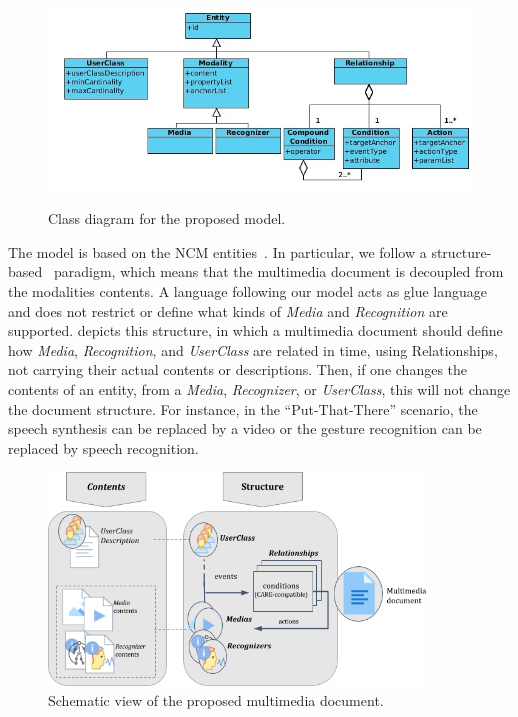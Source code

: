 \begin{figure}[!ht]
\begin{center}
	\includegraphics[width=12cm, keepaspectratio]{img/img9.png}
	\caption{Class diagram for the proposed model.}
	\captionvspace
	\label{fig:model}
\end{center}
\end{figure}

The model is based on the NCM entities~\cite{soares_nested_2009}. In particular,
we follow a structure-based~\cite{bolt_put-that-there:_1980} paradigm, which
means that the multimedia document is decoupled from the modalities contents. A
language following our model acts as glue language and does not restrict or
define what kinds of \textit{Media} and
\textit{Recognition} are supported.  depicts this structure,
in which a
multimedia document should define how \textit{Media}, \textit{Recognition}, and
\textit{UserClass }are related in time, using Relationships, not carrying their
actual contents or descriptions. Then, if one changes the contents of an entity,
from a
\textit{Media}, \textit{Recognizer}, or \textit{UserClass}, this will not change
the document structure. For instance, in the “Put-That-There” scenario, the
speech synthesis can be replaced by a video or the gesture recognition can be
replaced by speech recognition.

\begin{figure}[!ht]
\begin{center}
	\includegraphics[width=10cm, keepaspectratio]{img/img10.png}
	\caption{Schematic view of the proposed multimedia document.}
	\label{fig:shematic}
    \captionvspace
\end{center}
\end{figure}

